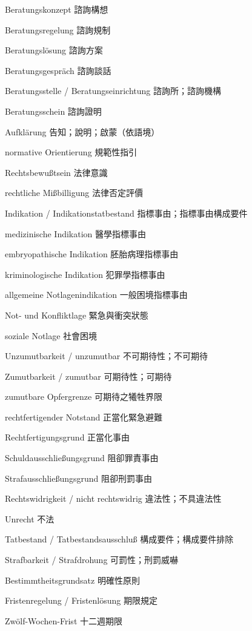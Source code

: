 \documentclass[12pt]{article}
\begin{document}
\begin{termbox}
\begin{termcolumns}
\begin{termitems}
\item[Beratungskonzept] 諮詢構想
\item[Beratungsregelung] 諮詢規制
\item[Beratungslösung] 諮詢方案
\item[Beratungsgespräch] 諮詢談話
\item[Beratungsstelle / Beratungseinrichtung] 諮詢所；諮詢機構
\item[Beratungsschein] 諮詢證明
\item[Aufklärung] 告知；說明；啟蒙（依語境）
\item[normative Orientierung] 規範性指引
\item[Rechtsbewußtsein] 法律意識
\item[rechtliche Mißbilligung] 法律否定評價
\item[Indikation / Indikationstatbestand] 指標事由；指標事由構成要件
\item[medizinische Indikation] 醫學指標事由
\item[embryopathische Indikation] 胚胎病理指標事由
\item[kriminologische Indikation] 犯罪學指標事由
\item[allgemeine Notlagenindikation] 一般困境指標事由
\item[Not- und Konfliktlage] 緊急與衝突狀態
\item[soziale Notlage] 社會困境
\item[Unzumutbarkeit / unzumutbar] 不可期待性；不可期待
\item[Zumutbarkeit / zumutbar] 可期待性；可期待
\item[zumutbare Opfergrenze] 可期待之犧牲界限
\item[rechtfertigender Notstand] 正當化緊急避難
\item[Rechtfertigungsgrund] 正當化事由
\item[Schuldausschließungsgrund] 阻卻罪責事由
\item[Strafausschließungsgrund] 阻卻刑罰事由
\item[Rechtswidrigkeit / nicht rechtswidrig] 違法性；不具違法性
\item[Unrecht] 不法
\item[Tatbestand / Tatbestandsausschluß] 構成要件；構成要件排除
\item[Strafbarkeit / Strafdrohung] 可罰性；刑罰威嚇
\item[Bestimmtheitsgrundsatz] 明確性原則
\item[Fristenregelung / Fristenlösung] 期限規定
\item[Zwölf-Wochen-Frist] 十二週期限

\end{termitems}
\end{termcolumns}
\end{termbox}
\end{document}
